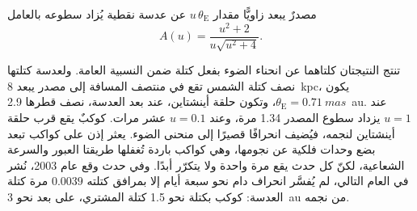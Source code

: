 \begin{proposition}\label{prop:b3:exoplanets:magnification}
مصدرٌ يبعد زاويًّا مقدار $u\,\theta_\mathrm E$ عن عدسة نقطية
يُزاد سطوعه بالعامل
\[
A(u) = \frac{u^2 + 2}{u\sqrt{u^2 + 4}} .
\]
\end{proposition}

\admitted

تنتج النتيجتان كلتاهما عن انحناء الضوء بفعل كتلة ضمن النسبية العامة.
ولعدسة كتلتها نصف كتلة الشمس تقع في منتصف المسافة إلى مصدر
يبعد \qty{8}{kpc}، يكون $\theta_\mathrm E = \qty{0.71}{mas}$، وتكون حلقة
أينشتاين، عند بعد العدسة، نصف قطرها \qty{2.9}{au}. عند
$u = 1$ يزداد سطوع المصدر 1.34 مرة، وعند $u = 0.1$ عشر مرات. كوكبٌ
يقع قرب حلقة أينشتاين لنجمه، فيُضيف انحرافًا قصيرًا إلى
منحنى الضوء. يعثر  إذن على كواكب تبعد بضع وحدات فلكية
عن نجومها، وهي كواكب باردة تُغفلها طريقتا العبور والسرعة الشعاعية،
لكنّ كل حدث يقع مرة واحدة ولا يتكرّر أبدًا. وفي حدث وقع عام 2003،
نُشر في العام التالي، لم يُفسَّر انحراف دام نحو سبعة أيام إلا بمرافق
كتلته $\num{0.0039}$ مرة كتلة العدسة:
كوكب بكتلة نحو 1.5 كتلة المشتري، على بعد نحو \qty{3}{au} من
نجمه.

